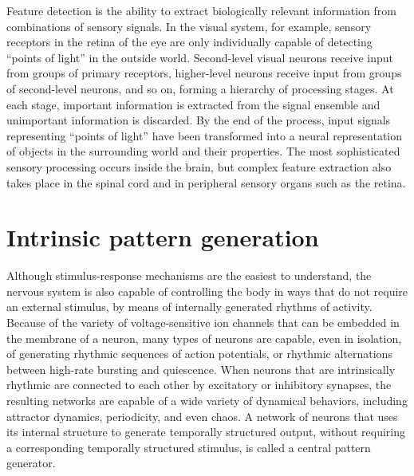 \documentclass[]{book}
\begin{document}
Feature detection is the ability to extract biologically relevant information from combinations of sensory signals. In the visual system, for example, sensory receptors in the retina of the eye are only individually capable of detecting ``points of light'' in the outside world. Second-level visual neurons receive input from groups of primary receptors, higher-level neurons receive input from groups of second-level neurons, and so on, forming a hierarchy of processing stages. At each stage, important information is extracted from the signal ensemble and unimportant information is discarded. By the end of the process, input signals representing ``points of light'' have been transformed into a neural representation of objects in the surrounding world and their properties. The most sophisticated sensory processing occurs inside the brain, but complex feature extraction also takes place in the spinal cord and in peripheral sensory organs such as the retina.

\hypertarget{intrinsic-pattern-generation}{%
\section{Intrinsic pattern generation}\label{intrinsic-pattern-generation}}

Although stimulus-response mechanisms are the easiest to understand, the nervous system is also capable of controlling the body in ways that do not require an external stimulus, by means of internally generated rhythms of activity. Because of the variety of voltage-sensitive ion channels that can be embedded in the membrane of a neuron, many types of neurons are capable, even in isolation, of generating rhythmic sequences of action potentials, or rhythmic alternations between high-rate bursting and quiescence. When neurons that are intrinsically rhythmic are connected to each other by excitatory or inhibitory synapses, the resulting networks are capable of a wide variety of dynamical behaviors, including attractor dynamics, periodicity, and even chaos. A network of neurons that uses its internal structure to generate temporally structured output, without requiring a corresponding temporally structured stimulus, is called a central pattern generator.
\end{document}
